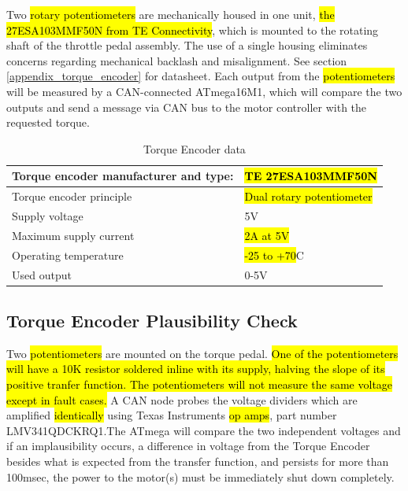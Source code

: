 \documentclass{article}
\begin{document}
Two \hl{rotary potentiometers} are mechanically housed in one unit, \hl{the 27ESA103MMF50N from TE Connectivity}, which is mounted to the rotating shaft of the throttle pedal assembly. The use of a single housing eliminates concerns regarding mechanical backlash and misalignment. See section \ref{appendix_torque_encoder} for datasheet. Each output from the \hl{potentiometers} will be measured by a CAN-connected ATmega16M1, which will compare the two outputs and send a message via CAN bus to the motor controller with the requested torque.

\begin{table}[H]
	\centering
	\begin{tabular}{|l|l|}
	\hline
	Torque encoder manufacturer and type: & \hl{TE 27ESA103MMF50N} \\ \hline
	Torque encoder principle & \hl{Dual rotary potentiometer}\\ \hline
	Supply voltage & 5V\\ \hline
	Maximum supply current & \hl{2A at 5V} \\ \hline
	Operating temperature & \hl{-25 to +70}\degree C \\ \hline
	Used output & 0-5V \\ \hline
	\end{tabular}
	\caption{Torque Encoder data}
	\label{encoder}
\end{table}

\subsection{Torque Encoder Plausibility Check}\label{torque_encoder_plausibility_check}

Two \hl{potentiometers} are mounted on the torque pedal. \hl{One of the potentiometers will have a 10K resistor soldered inline with its supply, halving the slope of its positive tranfer function. The potentiometers will not measure the same voltage except in fault cases.} A CAN node probes the voltage dividers which are amplified \hl{identically} using  Texas Instruments \hl{op amps}, part number LMV341QDCKRQ1.The ATmega will compare the two independent voltages and if an implausibility occurs, a difference in voltage from the Torque Encoder besides what is expected from the transfer function, and persists for more than 100msec, the power to the motor(s) must be immediately shut down completely. 
\end{document}
